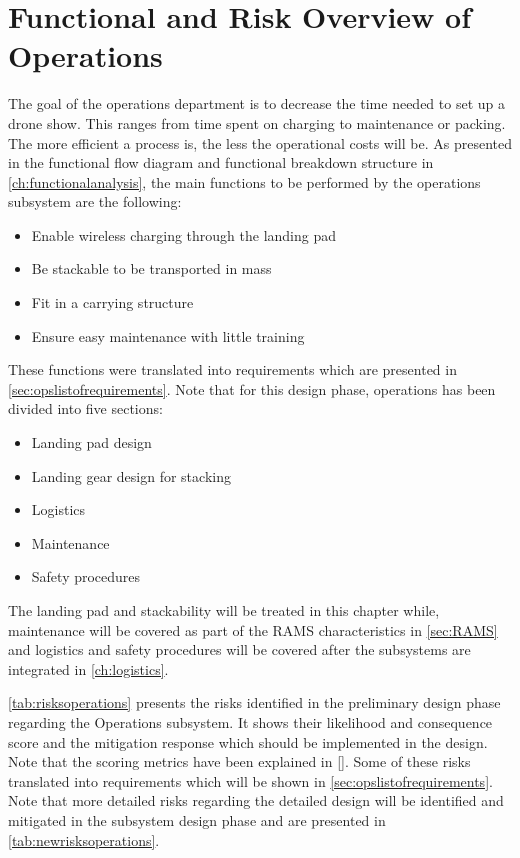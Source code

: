 \section{Functional and Risk Overview of Operations} \label{sec:opsfuncrecap}
The goal of the operations department is to decrease the time needed to set up a drone show. This ranges from time spent on charging to maintenance or packing. The more efficient a process is, the less the operational costs will be. As presented in the functional flow diagram and functional breakdown structure in \autoref{ch:functionalanalysis}, the main functions to be performed by the operations subsystem are the following:
\begin{itemize}[noitemsep, nolistsep]
    \item Enable wireless charging through the landing pad
    \item Be stackable to be transported in mass
    \item Fit in a carrying structure
    \item Ensure easy maintenance with little training
\end{itemize}
These functions were translated into requirements which are presented in \autoref{sec:opslistofrequirements}. Note that for this design phase, operations has been divided into five sections:
\begin{itemize}[noitemsep, nolistsep]
    \item Landing pad design
    \item Landing gear design for stacking
    \item Logistics
    \item Maintenance
    \item Safety procedures
\end{itemize}

The landing pad and stackability will be treated in this chapter while, maintenance will be covered as part of the RAMS characteristics in \autoref{sec:RAMS} and logistics and safety procedures will be covered after the subsystems are integrated in \autoref{ch:logistics}.

\autoref{tab:risksoperations} presents the risks identified in the preliminary design phase regarding the Operations subsystem. It shows their likelihood and consequence score and the mitigation response which should be implemented in the design. Note that the scoring metrics have been explained in \autoref{}. Some of these risks translated into requirements which will be shown in \autoref{sec:opslistofrequirements}. Note that more detailed risks regarding the detailed design will be identified and mitigated in the subsystem design phase and are presented in \autoref{tab:newrisksoperations}.


